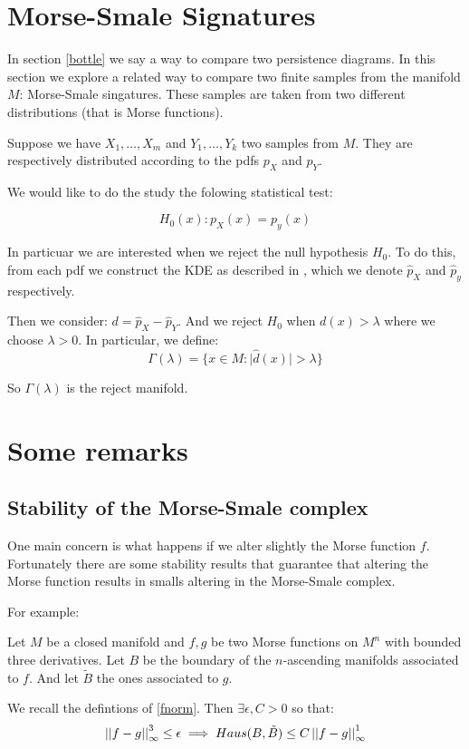 \section{Morse-Smale Signatures}

In section \ref{bottle} we say a way to compare two persistence diagrams. In this section we explore a related way to compare
two finite samples from the manifold $M$:
Morse-Smale singatures.
These samples are taken from two different distributions (that is Morse functions).

Suppose we have $X_1,\ldots,X_m$ and $Y_1,\ldots,Y_k$ two samples from $M$.  
They are respectively distributed according to the pdfs $p_X$ and $p_Y$.

We would like to do the study the folowing statistical test:

$$
H_0(x):p_X(x)=p_y(x)
$$

In particuar we are interested when we reject the null hypothesis $H_0$.
To do this, from each pdf we construct the KDE as described in \label{kde},
which we denote $\hat p_X$ and $\hat p_y$ respectively.



Then we consider: $d=\hat p_X - \hat p_Y$.
And we reject $H_0$ when $d(x)>\lambda$ where we choose $\lambda>0$.
In particular, we define:
$$
\Gamma(\lambda)=
\{
    x\in M:
    \vert \hat d(x) \vert > \lambda
\}
$$

So $\Gamma(\lambda)$ is the reject manifold.


\section{Some remarks}

\subsection{Stability of the Morse-Smale complex}

One main concern is what happens if we alter slightly the Morse function
$f$. Fortunately there are some stability results that guarantee that altering the 
Morse function results in smalls altering in the Morse-Smale complex.

For example:

\begin{theorem}
    Let $M$ be a closed manifold and $f,g$ be two Morse functions on $M^n$
    with bounded three derivatives.
    Let $B$ be the boundary of the $n$-ascending manifolds associated to $f$. 
    And let $\tilde B$ the ones associated to $g$.

    We recall the defintions of \ref{fnorm}.
    Then $\exists\epsilon,C>0$ so that:
    $$
    \left\vert\left\vert f-g \right\vert\right\vert_\infty^3\leq \epsilon
    \implies
    Haus(B,\tilde B)\leq C\left\vert\left\vert f-g \right\vert\right\vert_\infty^1
    $$
\end{theorem}

